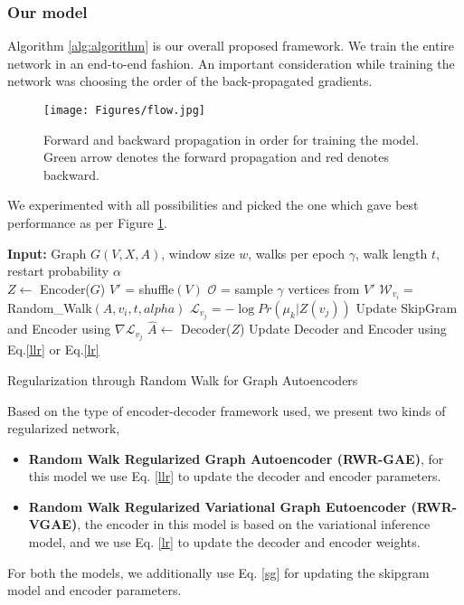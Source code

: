 \documentclass{article}
\begin{document}
\subsubsection{Our model}
Algorithm \ref{alg:algorithm} is our overall proposed framework. We train the entire network in an end-to-end fashion. An important consideration while training the network was choosing the order of the back-propagated gradients.
\begin{figure}[h]
\centering
\texttt{[image: Figures/flow.jpg]}
\caption{Forward and backward propagation in order for training the model. Green arrow denotes the forward propagation and red denotes backward.\label{flow}}
\end{figure}
We experimented with all possibilities and picked the one which gave best performance as per Figure \ref{flow}. 

\begin{algorithm}
\begin{algorithmic}
\State \textbf{Input:} Graph $G(V, X, A)$, window size $w$, walks per epoch $\gamma$, walk length $t$, restart probability $\alpha$\\

\State $Z \gets$ Encoder($G$)
\State $V'$ = shuffle$(V)$
\State $\mathcal{O}$ = sample $\gamma$ vertices from $V'$
\State $\mathcal{W}_{v_i} = $ Random\_Walk$(A, v_i, t, alpha)$
\State $\mathcal{L}_{v_j} = -\log Pr( \mu_k | Z(v_j))$
\State Update SkipGram and Encoder using $\nabla \mathcal{L}_{v_j}$
\EndFor
\EndFor
\EndFor
\State $\hat{A} \gets$ Decoder($Z$)
\State Update Decoder and Encoder using Eq.\ref{llr} or Eq.\ref{lr}
\caption{Regularization through Random Walk for Graph Autoencoders}
\label{alg:algorithm}
\end{algorithmic}
\end{algorithm}

Based on the type of encoder-decoder framework used, we present two kinds of regularized network,
\begin{itemize}
    \item \textbf{Random Walk Regularized Graph Autoencoder (RWR-GAE)}, for this model we use Eq. \ref{llr} to update the decoder and encoder parameters.
    \item \textbf{Random Walk Regularized Variational Graph Eutoencoder (RWR-VGAE)}, the encoder in this model is based on the variational inference model, and we use Eq. \ref{lr} to update the decoder and encoder weights.
\end{itemize}
For both the models, we additionally use Eq. \ref{sg} for updating the skipgram model and encoder parameters.
\end{document}
